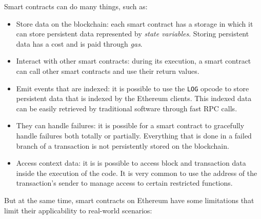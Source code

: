 Smart contracts can do many things, such as:

\begin{itemize}
    \item Store data on the blockchain: each smart contract has a storage in which it can store persistent data represented by \textit{state variables}. Storing persistent data has a cost and is paid through \textit{gas}.
    \item Interact with other smart contracts: during its execution, a smart contract can call other smart contracts and use their return values.
    \item Emit events that are indexed: it is possible to use the \lstinline{LOG} opcode to store persistent data that is indexed by the Ethereum clients. This indexed data can be easily retrieved by traditional software through fast RPC calls. 
    \item They can handle failures: it is possible for a smart contract to gracefully handle failures both totally or partially. Everything that is done in a failed branch of a transaction is not persistently stored on the blockchain.
    \item Access context data: it is is possible to access block and transaction data inside the execution of the code. It is very common to use the address of the transaction's sender to manage access to certain restricted functions.
\end{itemize}

But at the same time, smart contracts on Ethereum have some limitations that limit their applicability to real-world scenarios:


